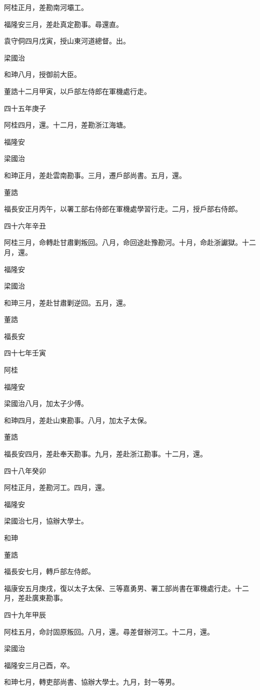 \begin{pinyinscope}
阿桂正月，差勘南河壩工。

福隆安三月，差赴真定勘事。尋還直。

袁守侗四月戊寅，授山東河道總督。出。

梁國治

和珅八月，授御前大臣。

董誥十二月甲寅，以戶部左侍郎在軍機處行走。

四十五年庚子

阿桂四月，還。十二月，差勘浙江海塘。

福隆安

梁國治

和珅正月，差赴雲南勘事。三月，遷戶部尚書。五月，還。

董誥

福長安正月丙午，以署工部右侍郎在軍機處學習行走。二月，授戶部右侍郎。

四十六年辛丑

阿桂三月，命轉赴甘肅剿叛回。八月，命回途赴豫勘河。十月，命赴浙讞獄。十二月，還。

福隆安

梁國治

和珅三月，差赴甘肅剿逆回。五月，還。

董誥

福長安

四十七年壬寅

阿桂

福隆安

梁國治八月，加太子少傅。

和珅四月，差赴山東勘事。八月，加太子太保。

董誥

福長安四月，差赴奉天勘事。九月，差赴浙江勘事。十二月，還。

四十八年癸卯

阿桂正月，差勘河工。四月，還。

福隆安

梁國治七月，協辦大學士。

和珅

董誥

福長安七月，轉戶部左侍郎。

福康安五月庚戌，復以太子太保、三等嘉勇男、署工部尚書在軍機處行走。十二月，差赴廣東勘事。

四十九年甲辰

阿桂五月，命討固原叛回。八月，還。尋差督辦河工。十二月，還。

梁國治

福隆安三月己酉，卒。

和珅七月，轉吏部尚書、協辦大學士。九月，封一等男。


\end{pinyinscope}
